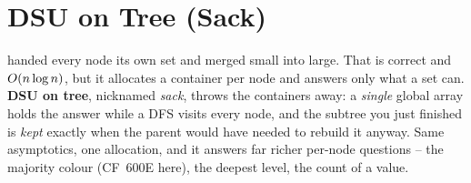 \section{DSU on Tree (Sack)}\label{sec:c28-sack}

\begin{previouslybox}
 handed every node its own set and merged small into large.
That is correct and \(O(n\log n)\), but it allocates a container per node
and answers only what a set can.  \textbf{DSU on tree}, nicknamed
\emph{sack}, throws the containers away: a \emph{single} global array holds the
answer while a DFS visits every node, and the subtree you just finished is
\emph{kept} exactly when the parent would have needed to rebuild it anyway.
Same asymptotics, one allocation, and it answers far richer per-node questions
-- the majority colour (CF~600E here), the deepest level, the count of a value.
\end{previouslybox}


